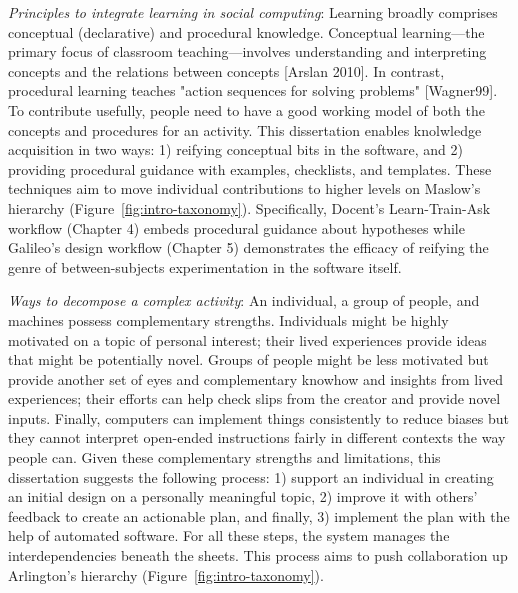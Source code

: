 \textit{Principles to integrate learning in social computing}: Learning broadly comprises conceptual (declarative) and procedural knowledge. Conceptual learning---the primary focus of classroom teaching---involves understanding and interpreting concepts and the relations between concepts [Arslan 2010]. In contrast, procedural learning teaches "action sequences for solving problems" [Wagner99]. To contribute usefully, people need to have a good working model of both the concepts and procedures for an activity. This dissertation enables knolwledge acquisition in two ways: 1) reifying conceptual bits in the software, and 2) providing procedural guidance with examples, checklists, and templates. These techniques aim to move individual contributions to higher levels on Maslow's hierarchy (Figure~\ref{fig:intro-taxonomy}). 
Specifically, Docent's Learn-Train-Ask workflow (Chapter 4) embeds procedural guidance about hypotheses while Galileo's design workflow (Chapter 5) demonstrates the efficacy of reifying the genre of between-subjects experimentation in the software itself.


\textit{Ways to decompose a complex activity}: 
An individual, a group of people, and machines possess complementary strengths. Individuals might be highly motivated on a topic of personal interest; their lived experiences provide ideas that might be potentially novel. Groups of people might be less motivated but provide another set of eyes and complementary knowhow and insights from lived experiences; their efforts can help check slips from the creator and provide novel inputs. Finally, computers can implement things consistently to reduce biases but they cannot interpret open-ended instructions fairly in different contexts the way people can. Given these complementary strengths and limitations, this dissertation suggests the following process: 1) support an individual in creating an initial design on a personally meaningful topic, 2) improve it with others' feedback to create an actionable plan, and finally, 3) implement the plan with the help of automated software. For all these steps, the system manages the interdependencies beneath the sheets. This process aims to push collaboration up Arlington's hierarchy (Figure~\ref{fig:intro-taxonomy}). 

